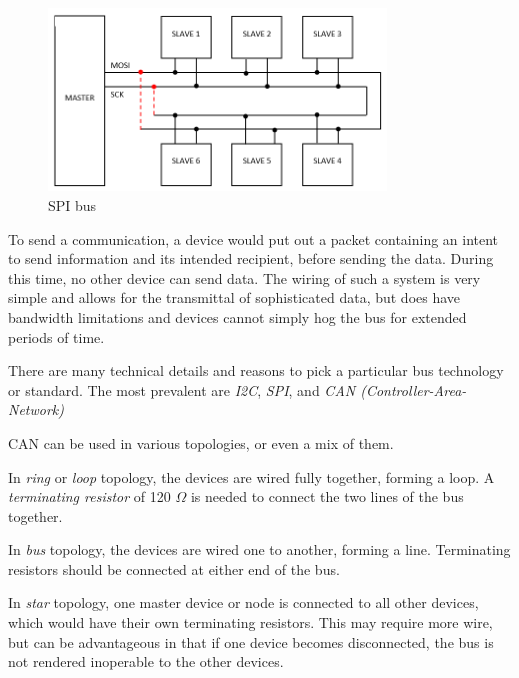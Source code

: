 \begin{figure}[H]
\includegraphics[width=0.8\textwidth]{imgs/bus_spi.png}
\caption{SPI bus}
\end{figure}

To send a communication, a device would put out a packet containing an intent to send information and its intended recipient, before sending the data. During this time, no other device can send data. The wiring of such a system is very simple and allows for the transmittal of sophisticated data, but does have bandwidth limitations and devices cannot simply hog the bus for extended periods of time.

There are many technical details and reasons to pick a particular bus technology or standard. The most prevalent are \textit{I2C}, \textit{SPI}, and \textit{CAN (Controller-Area-Network)}

CAN can be used in various topologies, or even a mix of them.

\begin{asparaenum}[A]
  \item In \textit{ring} or \textit{loop} topology, the devices are wired fully together, forming a loop. A \textit{terminating resistor} of 120 $\Omega$ is needed to connect the two lines of the bus together.
  \item In \textit{bus} topology, the devices are wired one to another, forming a line. Terminating resistors should be connected at either end of the bus.
  \item In \textit{star} topology, one master device or node is connected to all other devices, which would have their own terminating resistors. This may require more wire, but can be advantageous in that if one device becomes disconnected, the bus is not rendered inoperable to the other devices.
\end{asparaenum}